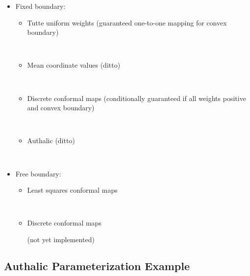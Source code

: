 \begin{itemize}

\item Fixed boundary:

    \begin{itemize}

    \item Tutte uniform weights (guaranteed one-to-one mapping for
    convex boundary)

      \\

    \item Mean coordinate values (ditto)

      \\

    \item Discrete conformal maps (conditionally guaranteed if all
    weights positive and convex boundary)

      \\

    \item Authalic (ditto)

      \\

    \end{itemize}

\item Free boundary:

    \begin{itemize}

    \item Least squares conformal maps

      \\

    \item Discrete conformal maps

    (not yet implemented)

    \end{itemize}

\end{itemize}


\subsection{Authalic Parameterization Example}

